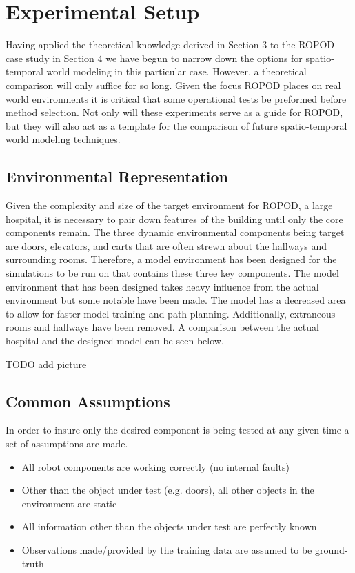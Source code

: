 

  \chapter{Experimental Setup}

  Having applied the theoretical knowledge derived in Section 3 to the ROPOD case
  study in Section 4 we have begun to narrow down the options for spatio-temporal
  world modeling in this particular case. However, a theoretical comparison will
  only suffice for so long. Given the focus ROPOD places on real world
  environments it is critical that some operational tests be preformed before
  method selection. Not only will these experiments serve as a guide for ROPOD,
  but they will also act as a template for the comparison of future
  spatio-temporal world modeling techniques.


  \section{ Environmental Representation}

  Given the complexity and size of the target environment for ROPOD, a large
  hospital, it is necessary to pair down features of the building until only the
  core components remain. The three dynamic environmental components being
  target are doors, elevators, and carts that are often strewn about the
  hallways and surrounding rooms. Therefore, a model environment has been
  designed for the simulations to be run on that contains these three key
  components.  The model environment that has been designed takes heavy
  influence from the actual environment but some notable have been made. The
  model has a decreased area to allow for faster model training and path
  planning. Additionally, extraneous rooms and hallways have been removed. A
  comparison between the actual hospital and the designed model can be seen below.

  TODO add picture


  \section{ Common Assumptions }
  In order to insure only the desired component is being tested at any given
  time a set of assumptions are made.

  \begin{itemize}

    \item All robot components are working correctly (no internal faults)

    \item Other than the object under test (e.g. doors), all other objects in the
          environment are static

    \item All information other than the objects under test are perfectly known

    \item Observations made/provided by the training data are assumed to be ground-truth

  \end{itemize}


